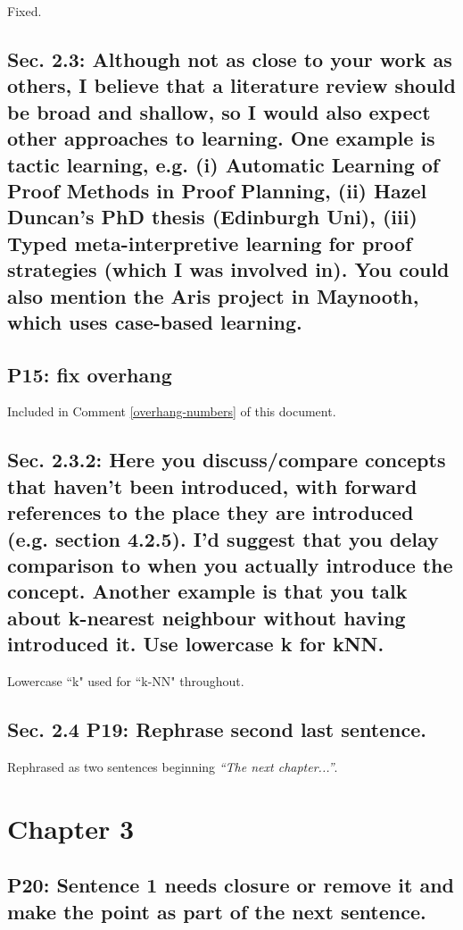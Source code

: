 \documentclass[]{article}
\begin{document}
Fixed.

\subsection{Sec. 2.3: Although not as close to your work as others, I believe that a literature review should be broad and shallow, so I would also expect other approaches to learning. One example is tactic learning, e.g. (i) Automatic Learning of Proof Methods in Proof Planning, (ii) Hazel Duncan's PhD thesis (Edinburgh Uni), (iii) Typed meta-interpretive learning for proof strategies (which I was involved in). You could also mention the Aris project in Maynooth, which uses case-based learning.}

\subsection{P15: fix overhang}

Included in Comment \ref{overhang-numbers} of this document.

\subsection{Sec. 2.3.2: Here you discuss/compare concepts that haven't been introduced, with forward references to the place they are introduced (e.g. section 4.2.5). I'd suggest that you delay comparison to when you actually introduce the concept. Another example is that you talk about k-nearest neighbour without having introduced it. Use lowercase k for kNN.}

Lowercase ``k" used for ``k-NN" throughout.

\subsection{Sec. 2.4 P19: Rephrase second last sentence.}

Rephrased as two sentences beginning \emph{``The next chapter...''}.

\section{Chapter 3}

\subsection{P20: Sentence 1 needs closure or remove it and make the point as part of the next sentence.}
\end{document}
